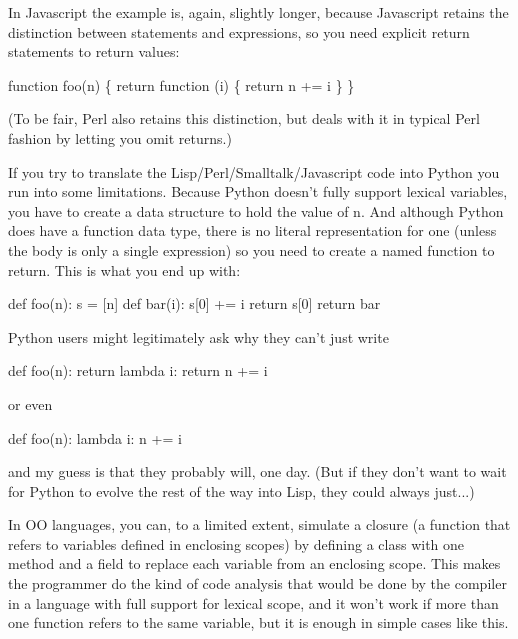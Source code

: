 In Javascript the example is, again,
                  slightly longer, because Javascript retains the distinction
                  between statements and expressions, so you need explicit
                  return statements to return values:
                  
                    
function foo(n) \{ 
  return function (i) \{ 
           return n += i \} \}

                  
                  (To be fair, Perl also retains this distinction, but deals
                  with it in typical Perl fashion by letting you omit
                  returns.)

If you try to translate the
                  Lisp/Perl/Smalltalk/Javascript code into Python you run into
                  some limitations. Because Python doesn't fully support lexical
                  variables, you have to create a data structure to hold the
                  value of n. And although Python does have a function data
                  type, there is no literal representation for one (unless the
                  body is only a single expression) so you need to create a
                  named function to return. This is what you end up with:
                  
                    
def foo(n):
  s = [n]
  def bar(i):
    s[0] += i
    return s[0] 
  return bar

                  
                  Python users might legitimately ask why they can't just write
                  
                    
def foo(n):
  return lambda i: return n += i

                  
                  or even
                  
                    
def foo(n):
  lambda i: n += i

                  
                  and my guess is that they probably will, one day. (But if they
                  don't want to wait for Python to evolve the rest of the way
                  into Lisp, they could always just...)
                  

In OO languages, you can, to a limited
                  extent, simulate a closure (a function that refers to
                  variables defined in enclosing scopes) by defining a class
                  with one method and a field to replace each variable from an
                  enclosing scope. This makes the programmer do the kind of code
                  analysis that would be done by the compiler in a language with
                  full support for lexical scope, and it won't work if more than
                  one function refers to the same variable, but it is enough in
                  simple cases like this.

